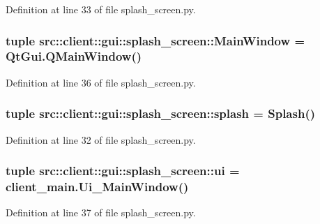 Definition at line 33 of file splash\_\-screen.py.

\hypertarget{namespacesrc_1_1client_1_1gui_1_1splash__screen_a4f55ad57577419ddc7b97392048b7ffd}{
\subsubsection[{MainWindow}]{\setlength{\rightskip}{0pt plus 5cm}tuple {\bf src::client::gui::splash\_\-screen::MainWindow} = QtGui.QMainWindow()}}
\label{namespacesrc_1_1client_1_1gui_1_1splash__screen_a4f55ad57577419ddc7b97392048b7ffd}


Definition at line 36 of file splash\_\-screen.py.

\hypertarget{namespacesrc_1_1client_1_1gui_1_1splash__screen_af95af111820af72f3d99c2b39ba0bd31}{
\subsubsection[{splash}]{\setlength{\rightskip}{0pt plus 5cm}tuple {\bf src::client::gui::splash\_\-screen::splash} = {\bf Splash}()}}
\label{namespacesrc_1_1client_1_1gui_1_1splash__screen_af95af111820af72f3d99c2b39ba0bd31}


Definition at line 32 of file splash\_\-screen.py.

\hypertarget{namespacesrc_1_1client_1_1gui_1_1splash__screen_a437e74b30a8d13f598dab0b047c644f9}{
\subsubsection[{ui}]{\setlength{\rightskip}{0pt plus 5cm}tuple {\bf src::client::gui::splash\_\-screen::ui} = {\bf client\_\-main.Ui\_\-MainWindow}()}}
\label{namespacesrc_1_1client_1_1gui_1_1splash__screen_a437e74b30a8d13f598dab0b047c644f9}


Definition at line 37 of file splash\_\-screen.py.

